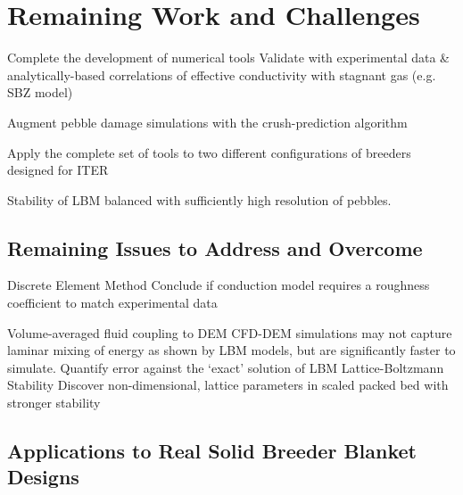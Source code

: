 \chapter{Remaining Work and Challenges}\label{sec:remaining}

Complete the development of numerical tools
Validate with experimental data \& analytically-based correlations of effective conductivity with stagnant gas (e.g. SBZ model)

Augment pebble damage simulations with the crush-prediction algorithm

Apply the complete set of tools to two different configurations of breeders designed for ITER


Stability of LBM balanced with sufficiently high resolution of pebbles.

\section{Remaining Issues to Address and Overcome}
Discrete Element Method
Conclude if conduction model requires a roughness coefficient to match experimental data

Volume-averaged fluid coupling to DEM
CFD-DEM simulations may not capture laminar mixing of energy as shown by LBM models, but are significantly faster to simulate. Quantify error against the ‘exact’ solution of LBM
Lattice-Boltzmann Stability
Discover non-dimensional, lattice parameters in scaled packed bed with stronger stability


\section{Applications to Real Solid Breeder Blanket Designs}\label{sec:applied-studies}

